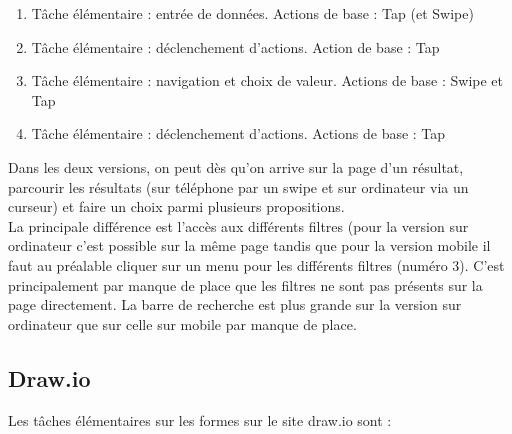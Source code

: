 \documentclass{article}
\begin{document}
\vspace{1cm}
\begin{enumerate}[label=\arabic*)]
\item Tâche élémentaire : entrée de données. Actions de base : Tap (et Swipe)
\item Tâche élémentaire : déclenchement d’actions. Action de base : Tap
\item Tâche élémentaire : navigation et choix de valeur. Actions de base : Swipe et Tap
\item Tâche élémentaire : déclenchement d’actions. Actions de base : Tap
\end{enumerate}


\vspace{2cm}

Dans les deux versions, on peut dès qu’on arrive sur la page d’un résultat, parcourir les résultats (sur téléphone par un swipe et sur ordinateur via un curseur) et faire un choix parmi plusieurs propositions.\\
La principale différence est l’accès aux différents filtres (pour la version sur ordinateur c’est possible sur la même page tandis que pour la version mobile il faut au préalable cliquer sur un menu pour les différents filtres (numéro 3). C’est principalement par manque de place que les filtres ne sont pas présents sur la page directement. La barre de recherche est plus grande sur la version sur ordinateur que sur celle sur mobile par manque de place. 



\clearpage


\subsection{Draw.io}
\quad Les tâches élémentaires sur les formes sur le site draw.io sont :\newline
\end{document}
